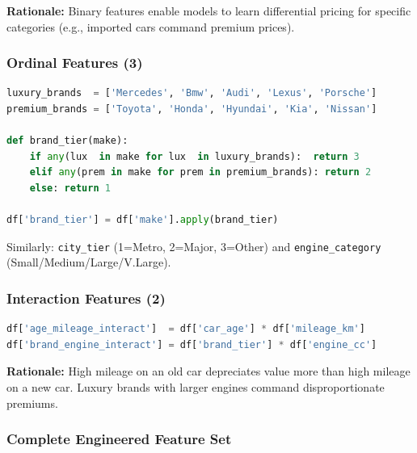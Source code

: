 \documentclass[12pt,a4paper]{article}
\begin{document}
\textbf{Rationale:} Binary features enable models to learn differential pricing for specific categories (e.g., imported cars command premium prices).

\subsubsection{Ordinal Features (3)}

\begin{lstlisting}[language=Python, caption=Ordinal Features]
luxury_brands  = ['Mercedes', 'Bmw', 'Audi', 'Lexus', 'Porsche']
premium_brands = ['Toyota', 'Honda', 'Hyundai', 'Kia', 'Nissan']

def brand_tier(make):
    if any(lux  in make for lux  in luxury_brands):  return 3
    elif any(prem in make for prem in premium_brands): return 2
    else: return 1

df['brand_tier'] = df['make'].apply(brand_tier)
\end{lstlisting}

Similarly: \texttt{city\_tier} (1=Metro, 2=Major, 3=Other) and \texttt{engine\_category} (Small/Medium/Large/V.Large).

\subsubsection{Interaction Features (2)}

\begin{lstlisting}[language=Python, caption=Feature Interactions]
df['age_mileage_interact']  = df['car_age'] * df['mileage_km']
df['brand_engine_interact'] = df['brand_tier'] * df['engine_cc']
\end{lstlisting}

\textbf{Rationale:} High mileage on an old car depreciates value more than high mileage on a new car. Luxury brands with larger engines command disproportionate premiums.

\subsubsection{Complete Engineered Feature Set}
\end{document}
